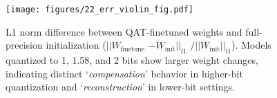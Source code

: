 \begin{figure}[t!]
    \centering
    \texttt{[image: figures/22\_err\_violin\_fig.pdf]}
    \caption{\small L1 norm difference between QAT-finetuned weights and full-precision initialization (\(||W_{\text{finetune}}\) \(- W_{\text{init}}||_{l1}\) \(/||W_{\text{init}}||_{l1}\)). Models quantized to 1, 1.58, and 2 bits show larger weight changes, indicating distinct `\textit{compensation}' behavior in higher-bit quantization and `\textit{reconstruction}' in lower-bit settings.}
    \label{fig:22_err_violin}
\end{figure}
